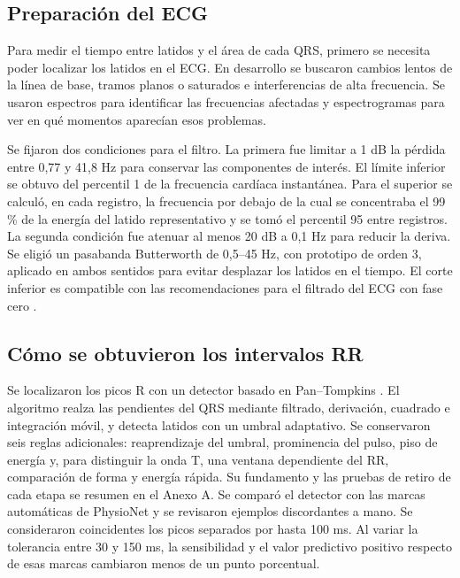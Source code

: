 \documentclass[10pt,a4paper]{article}
\begin{document}
\subsection{Preparación del ECG}
Para medir el tiempo entre latidos y el área de cada QRS, primero se necesita poder localizar los latidos en el ECG. En desarrollo se buscaron cambios lentos de la línea de base, tramos planos o saturados e interferencias de alta frecuencia. Se usaron espectros para identificar las frecuencias afectadas y espectrogramas para ver en qué momentos aparecían esos problemas.

Se fijaron dos condiciones para el filtro. La primera fue limitar a 1 dB la pérdida entre 0,77 y 41,8 Hz para conservar las componentes de interés. El límite inferior se obtuvo del percentil 1 de la frecuencia cardíaca instantánea. Para el superior se calculó, en cada registro, la frecuencia por debajo de la cual se concentraba el 99\,\% de la energía del latido representativo y se tomó el percentil 95 entre registros. La segunda condición fue atenuar al menos 20 dB a 0,1 Hz para reducir la deriva. Se eligió un pasabanda Butterworth de 0,5--45 Hz, con prototipo de orden 3, aplicado en ambos sentidos para evitar desplazar los latidos en el tiempo. El corte inferior es compatible con las recomendaciones para el filtrado del ECG con fase cero \cite{kligfield}.

\subsection{Cómo se obtuvieron los intervalos RR}
Se localizaron los picos R con un detector basado en Pan--Tompkins \cite{pan}. El algoritmo realza las pendientes del QRS mediante filtrado, derivación, cuadrado e integración móvil, y detecta latidos con un umbral adaptativo. Se conservaron seis reglas adicionales: reaprendizaje del umbral, prominencia del pulso, piso de energía y, para distinguir la onda T, una ventana dependiente del RR, comparación de forma y energía rápida. Su fundamento y las pruebas de retiro de cada etapa se resumen en el Anexo A. Se comparó el detector con las marcas automáticas de PhysioNet y se revisaron ejemplos discordantes a mano. Se consideraron coincidentes los picos separados por hasta 100 ms. Al variar la tolerancia entre 30 y 150 ms, la sensibilidad y el valor predictivo positivo respecto de esas marcas cambiaron menos de un punto porcentual.
\end{document}
